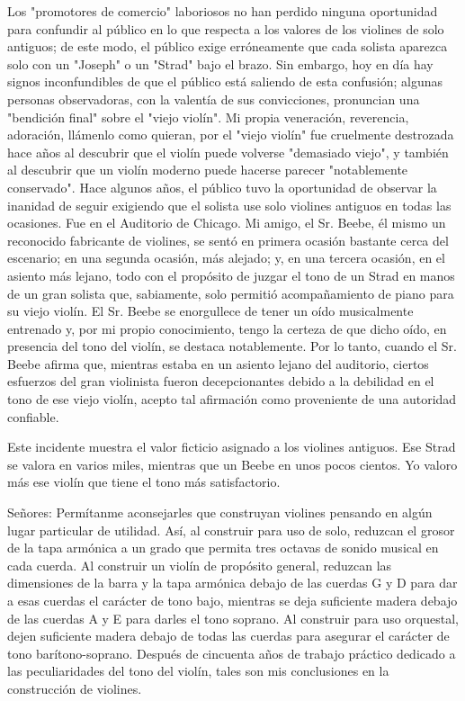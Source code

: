 \documentclass[12pt]{book}
\begin{document}
Los "promotores de comercio" laboriosos no han perdido ninguna oportunidad para confundir al público en lo que respecta a los valores de los violines de solo antiguos; de este modo, el público exige erróneamente que cada solista aparezca solo con un "Joseph" o un "Strad" bajo el brazo. Sin embargo, hoy en día hay signos inconfundibles de que el público está saliendo de esta confusión; algunas personas observadoras, con la valentía de sus convicciones, pronuncian una "bendición final" sobre el "viejo violín". Mi propia veneración, reverencia, adoración, llámenlo como quieran, por el "viejo violín" fue cruelmente destrozada hace años al descubrir que el violín puede volverse "demasiado viejo", y también al descubrir que un violín moderno puede hacerse parecer "notablemente conservado". Hace algunos años, el público tuvo la oportunidad de observar la inanidad de seguir exigiendo que el solista use solo violines antiguos en todas las ocasiones. Fue en el Auditorio de Chicago. Mi amigo, el Sr. Beebe, él mismo un reconocido fabricante de violines, se sentó en primera ocasión bastante cerca del escenario; en una segunda ocasión, más alejado; y, en una tercera ocasión, en el asiento más lejano, todo con el propósito de juzgar el tono de un Strad en manos de un gran solista que, sabiamente, solo permitió acompañamiento de piano para su viejo violín. El Sr. Beebe se enorgullece de tener un oído musicalmente entrenado y, por mi propio conocimiento, tengo la certeza de que dicho oído, en presencia del tono del violín, se destaca notablemente. Por lo tanto, cuando el Sr. Beebe afirma que, mientras estaba en un asiento lejano del auditorio, ciertos esfuerzos del gran violinista fueron decepcionantes debido a la debilidad en el tono de ese viejo violín, acepto tal afirmación como proveniente de una autoridad confiable.

Este incidente muestra el valor ficticio asignado a los violines antiguos. Ese Strad se valora en varios miles, mientras que un Beebe en unos pocos cientos. Yo valoro más ese violín que tiene el tono más satisfactorio.

Señores: Permítanme aconsejarles que construyan violines pensando en algún lugar particular de utilidad.
Así, al construir para uso de solo, reduzcan el grosor de la tapa armónica a un grado que permita tres octavas de sonido musical en cada cuerda. Al construir un violín de propósito general, reduzcan las dimensiones de la barra y la tapa armónica debajo de las cuerdas G y D para dar a esas cuerdas el carácter de tono bajo, mientras se deja suficiente madera debajo de las cuerdas A y E para darles el tono soprano. Al construir para uso orquestal, dejen suficiente madera debajo de todas las cuerdas para asegurar el carácter de tono barítono-soprano. Después de cincuenta años de trabajo práctico dedicado a las peculiaridades del tono del violín, tales son mis conclusiones en la construcción de violines.
\end{document}
